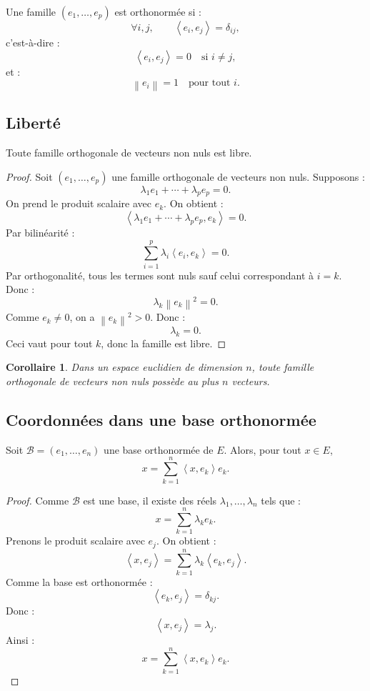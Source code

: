 \documentclass[11pt,a4paper]{article}
\newcommand{\norme}[1]{\left\lVert #1\right\rVert}
\newcommand{\scal}[2]{\left\langle #1,#2\right\rangle}
\newtheorem{corollaire}[prop]{Corollaire}
\begin{document}
\begin{definitionbox}
Une famille \((e_1,\dots,e_p)\) est orthonormée si :
\[
\forall i,j,\qquad \scal{e_i}{e_j}=\delta_{ij},
\]
c'est-à-dire :
\[
\scal{e_i}{e_j}=0\quad\text{si }i\neq j,
\]
et :
\[
\norme{e_i}=1\quad\text{pour tout }i.
\]
\end{definitionbox}

\subsection{Liberté}

\begin{theorembox}
Toute famille orthogonale de vecteurs non nuls est libre.
\end{theorembox}

\begin{proof}
Soit \((e_1,\dots,e_p)\) une famille orthogonale de vecteurs non nuls.  
Supposons :
\[
\lambda_1e_1+\cdots+\lambda_pe_p=0.
\]
On prend le produit scalaire avec \(e_k\).  
On obtient :
\[
\scal{\lambda_1e_1+\cdots+\lambda_pe_p}{e_k}=0.
\]
Par bilinéarité :
\[
\sum_{i=1}^p\lambda_i\scal{e_i}{e_k}=0.
\]
Par orthogonalité, tous les termes sont nuls sauf celui correspondant à \(i=k\).  
Donc :
\[
\lambda_k\norme{e_k}^2=0.
\]
Comme \(e_k\neq0\), on a \(\norme{e_k}^2>0\).  
Donc :
\[
\lambda_k=0.
\]
Ceci vaut pour tout \(k\), donc la famille est libre.
\end{proof}

\begin{corollaire}
Dans un espace euclidien de dimension \(n\), toute famille orthogonale de vecteurs non nuls possède au plus \(n\) vecteurs.
\end{corollaire}

\subsection{Coordonnées dans une base orthonormée}

\begin{theorembox}
Soit \(\mathcal B=(e_1,\dots,e_n)\) une base orthonormée de \(E\).  
Alors, pour tout \(x\in E\),
\[
x=\sum_{k=1}^n \scal{x}{e_k}e_k.
\]
\end{theorembox}

\begin{proof}
Comme \(\mathcal B\) est une base, il existe des réels \(\lambda_1,\dots,\lambda_n\) tels que :
\[
x=\sum_{k=1}^n\lambda_ke_k.
\]
Prenons le produit scalaire avec \(e_j\).  
On obtient :
\[
\scal{x}{e_j}
=
\sum_{k=1}^n\lambda_k\scal{e_k}{e_j}.
\]
Comme la base est orthonormée :
\[
\scal{e_k}{e_j}=\delta_{kj}.
\]
Donc :
\[
\scal{x}{e_j}=\lambda_j.
\]
Ainsi :
\[
x=\sum_{k=1}^n\scal{x}{e_k}e_k.
\]
\end{proof}
\end{document}
